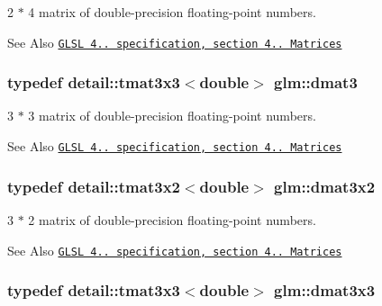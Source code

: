 2 $\ast$ 4 matrix of double-\/precision floating-\/point numbers. 

\begin{DoxySeeAlso}{See Also}
\href{http://www.opengl.org/registry/doc/GLSLangSpec.4.20.8.pdf}{\tt G\-L\-S\-L 4.. specification, section 4.. Matrices} 
\end{DoxySeeAlso}
\hypertarget{group__core__types_ga557f8357220829c6a6a3e28640e33507}{
\subsubsection[{dmat3}]{\setlength{\rightskip}{0pt plus 5cm}typedef detail\-::tmat3x3$<$double$>$ {\bf glm\-::dmat3}}}\label{group__core__types_ga557f8357220829c6a6a3e28640e33507}


3 $\ast$ 3 matrix of double-\/precision floating-\/point numbers. 

\begin{DoxySeeAlso}{See Also}
\href{http://www.opengl.org/registry/doc/GLSLangSpec.4.20.8.pdf}{\tt G\-L\-S\-L 4.. specification, section 4.. Matrices} 
\end{DoxySeeAlso}
\hypertarget{group__core__types_ga44d603bc9ed3688928f508fb161c71f0}{
\subsubsection[{dmat3x2}]{\setlength{\rightskip}{0pt plus 5cm}typedef detail\-::tmat3x2$<$double$>$ {\bf glm\-::dmat3x2}}}\label{group__core__types_ga44d603bc9ed3688928f508fb161c71f0}


3 $\ast$ 2 matrix of double-\/precision floating-\/point numbers. 

\begin{DoxySeeAlso}{See Also}
\href{http://www.opengl.org/registry/doc/GLSLangSpec.4.20.8.pdf}{\tt G\-L\-S\-L 4.. specification, section 4.. Matrices} 
\end{DoxySeeAlso}
\hypertarget{group__core__types_ga415251df22cffb39bc14078ff057a6c3}{
\subsubsection[{dmat3x3}]{\setlength{\rightskip}{0pt plus 5cm}typedef detail\-::tmat3x3$<$double$>$ {\bf glm\-::dmat3x3}}}\label{group__core__types_ga415251df22cffb39bc14078ff057a6c3}



